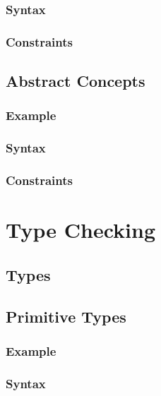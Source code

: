 \documentclass[a4paper,oneside,12pt, extrafontsizes]{memoir}
\theoremstyle{definition}
\theoremstyle{definition}
\theoremstyle{definition}
\theoremstyle{definition}
\begin{document}
\section{Syntax}


\section{Constraints}


\chapter{Abstract Concepts}
\label{ch:abstract}


\section{Example}


\section{Syntax}


\section{Constraints}


\part{Type Checking}

\chapter{Types}

\chapter{Primitive Types}
\label{ch:primitive-types}


\section{Example}


\section{Syntax}

\end{document}
